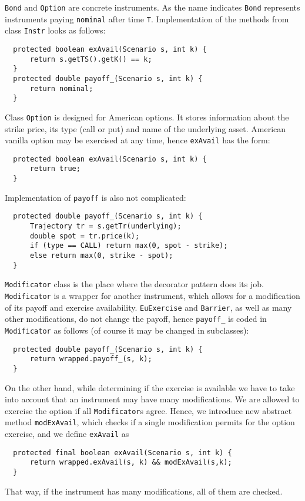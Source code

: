 \documentclass[a4paper,11pt, twoside]{book}
\theoremstyle{definition}
\theoremstyle{remark}
\begin{document}
\texttt{Bond} and \texttt{Option} are concrete instruments. As the name indicates \texttt{Bond} represents instruments paying \texttt{nominal} after time \texttt{T}. Implementation of the methods from class \texttt{Instr} looks as follows: 
\begin{lstlisting}
  protected boolean exAvail(Scenario s, int k) {        
      return s.getTS().getK() == k;
  }
  protected double payoff_(Scenario s, int k) {
      return nominal;
  }
\end{lstlisting}

	
Class \texttt{Option} is designed for American options. It stores information about the strike price, its type (call or put) and name of the underlying asset. American vanilla option may be exercised at any time, hence \texttt{exAvail} has the form:
\begin{lstlisting}
  protected boolean exAvail(Scenario s, int k) {
      return true;
  }
\end{lstlisting}
Implementation of \texttt{payoff} is also not complicated:
\begin{lstlisting}
  protected double payoff_(Scenario s, int k) {
      Trajectory tr = s.getTr(underlying);
      double spot = tr.price(k);
      if (type == CALL) return max(0, spot - strike);
      else return max(0, strike - spot);
  }
\end{lstlisting}

\texttt{Modificator} class is the place where the decorator pattern does its job. \texttt{Modificator} is a wrapper for another instrument, which allows for a modification of its payoff and exercise availability. \texttt{EuExercise} and \texttt{Barrier}, as well as many other modifications, do not change the payoff, hence \texttt{payoff\_} is coded in \texttt{Modificator} as follows (of course it may be changed in subclasses):
\begin{lstlisting}
  protected double payoff_(Scenario s, int k) {
      return wrapped.payoff_(s, k);
  }
\end{lstlisting}
On the other hand, while determining if the exercise is available we have to take into account that an instrument may have many modifications. We are allowed to exercise the option if all \texttt{Modificator}s agree. Hence, we introduce new abstract method \texttt{modExAvail}, which checks if a single modification permits for the option exercise, and we define \texttt{exAvail} as
\begin{lstlisting}
  protected final boolean exAvail(Scenario s, int k) {
      return wrapped.exAvail(s, k) && modExAvail(s,k);
  }
\end{lstlisting}
That way, if the instrument has many modifications, all of them are checked.
\end{document}
